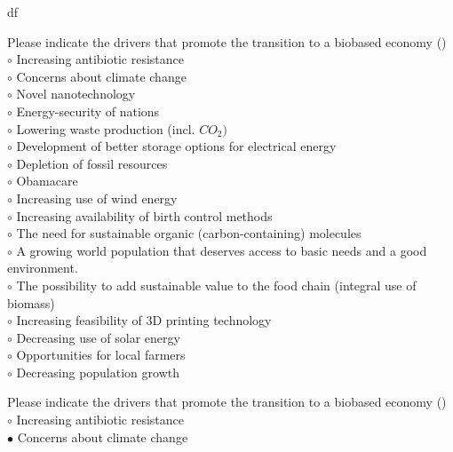 df\documentclass[]{beamer}
\begin{document}
\begin{CJK}{UTF8}{gbsn}
\begin{frame}[shrink] {}
\addtocounter{questions}{1}
\color{blue}
Please indicate the drivers that promote the transition to a biobased economy
({})\\
\color{black}
\setlength{\parindent}{-0.4cm}
{\color{red}$\circ$} Increasing antibiotic resistance  \\
{\color{red}$\circ$}     Concerns about climate change  \\
{\color{red}$\circ$}  Novel nanotechnology   \\
{\color{red}$\circ$}  Energy-security of nations  \\
{\color{red}$\circ$}  Lowering waste production (incl. $CO_{2})$   \\
{\color{red}$\circ$} Development of better storage options for electrical energy  \\
{\color{red}$\circ$}  Depletion of fossil resources   \\
{\color{red}$\circ$} Obamacare  \\
{\color{red}$\circ$} Increasing use of wind energy  \\
{\color{red}$\circ$} Increasing availability of birth control methods  \\
{\color{red}$\circ$}  The need for sustainable organic (carbon-containing) molecules  \\
{\color{red}$\circ$}  A growing world population that deserves access to basic needs and a good environment.  \\
{\color{red}$\circ$}  The possibility to add sustainable value to the food chain (integral use of biomass)  \\
{\color{red}$\circ$} Increasing feasibility of 3D printing technology  \\
{\color{red}$\circ$} Decreasing use of solar energy  \\
{\color{red}$\circ$}  Opportunities for local farmers  \\
{\color{red}$\circ$} Decreasing population growth  \\
\end{frame}
\begin{frame}[shrink] {}
\addtocounter{answers}{1}
\color{blue}
Please indicate the drivers that promote the transition to a biobased economy
({})\\
\color{black}
\setlength{\parindent}{-0.4cm}
{\color{red}$\circ$} Increasing antibiotic resistance  \\
{\color{red}$\bullet$} Concerns about climate change  \\

\end{frame}
\end{CJK}
\end{document}
